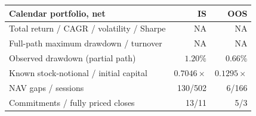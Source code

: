\documentclass[11pt,letterpaper]{article}
\begin{document}
\begin{center}\begin{tabular}{@{}lrr@{}}
\toprule Calendar portfolio, net & IS & OOS\\\midrule
Total return / CAGR / volatility / Sharpe & NA & NA\\
Full-path maximum drawdown / turnover & NA & NA\\
Observed drawdown (partial path) & $1.20\%$ & $0.66\%$\\
Known stock-notional / initial capital & $0.7046\times$ & $0.1295\times$\\
NAV gaps / sessions & 130/502 & 6/166\\
Commitments / fully priced closes & 13/11 & 5/3\\
\bottomrule\end{tabular}\end{center}
\end{document}
